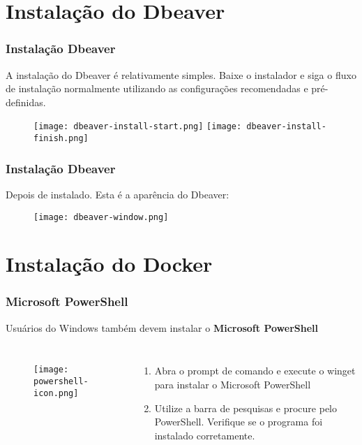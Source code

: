 \documentclass[t, 10pt, aspectratio=169, table, x11names]{beamer}
\begin{document}
	\section{Instalação do Dbeaver}

	\begin{frame}
		\frametitle{Instalação Dbeaver}
		A instalação do Dbeaver é relativamente simples. Baixe o instalador e siga o fluxo de instalação normalmente utilizando as configurações recomendadas e pré-definidas.
		\begin{figure}[h]
			\centering\vspace{2mm}
			\texttt{[image: dbeaver-install-start.png]}
			\hspace{0.5cm}
			\texttt{[image: dbeaver-install-finish.png]}
		\end{figure}
	\end{frame}
	
	\begin{frame}
		\frametitle{Instalação Dbeaver}
		Depois de instalado. Esta é a aparência do Dbeaver:
		\begin{figure}[h]
			\centering\vspace{2mm}
			\texttt{[image: dbeaver-window.png]}
		\end{figure}
	\end{frame}

	\section{Instalação do Docker}

	\begin{frame}
		\frametitle{Microsoft PowerShell}
		Usuários do Windows também devem instalar o \textbf{Microsoft PowerShell}
		\vspace{0.6cm}
		\begin{columns}
			\column{0.07\textwidth}
			\column{0.15\textwidth}
			\begin{figure}[h]
				\texttt{[image: powershell-icon.png]}
			\end{figure}
			\column{0.80\textwidth}
			\begin{enumerate}
				\item Abra o prompt de comando e execute o winget para instalar o Microsoft PowerShell
				
				\vspace{0.4cm}
				\item Utilize a barra de pesquisas e procure pelo PowerShell. Verifique se o programa foi instalado corretamente.
			\end{enumerate}
			\column{0.60\textwidth}
		\end{columns}
	\end{frame}
	
\end{document}
